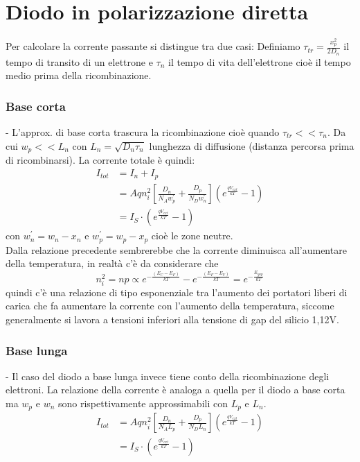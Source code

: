 \documentclass{article}
\begin{document}
\section*{Diodo in polarizzazione diretta}
Per calcolare la corrente passante si distingue tra due casi:
Definiamo $\tau_{tr} = \frac{x_p^2}{2D_n}$ il tempo di transito di un elettrone e $\tau_n$ il tempo di vita dell'elettrone cioè il tempo medio prima della  ricombinazione.

\subsubsection*{Base corta}
- L'approx. di base corta trascura la ricombinazione cioè quando $\tau_{tr}<<\tau_n$. Da cui $w_p<<L_n$ con $L_n = \sqrt{D_n \tau_n}$ lunghezza di diffusione (distanza percorsa prima di ricombinarsi).
La corrente totale è quindi:
\begin{align*}
I_{tot} &= I_n + I_p\\
&= Aqn_i^2 \left[ \frac{D_n}{N_A w_p^\prime} + \frac{D_p}{N_D w_n^\prime} \right] \left( e^\frac{qV_{ext}}{kT} - 1 \right)\\
&= I_S \cdot \left( e^\frac{qV_{ext}}{kT} - 1 \right)
\end{align*}
con $w_n^\prime = w_n - x_n$ e $w_p^\prime = w_p - x_p$ cioè le zone neutre.\\
Dalla relazione precedente sembrerebbe che la corrente diminuisca all'aumentare della temperatura, in realtà c'è da considerare che 
\begin{equation*}
n_i^2 = np \propto e^{-\frac{(E_C - E_F)}{kT}} - e^{-\frac{(E_F - E_V)}{kT}} = e^{-\frac{E_{gap}}{kT}}
\end{equation*}
quindi c'è una relazione di tipo esponenziale tra l'aumento dei portatori liberi di carica che fa aumentare la corrente con l'aumento della temperatura, siccome generalmente si lavora a tensioni inferiori alla tensione di gap del silicio 1,12V.

\subsubsection*{Base lunga}
- Il caso del diodo a base lunga invece tiene conto della ricombinazione degli elettroni. La relazione della corrente è analoga a quella per il diodo a base corta ma $w_p$ e $w_n$ sono rispettivamente approssimabili con $L_p$ e $L_n$. 
\begin{align*}
I_{tot} &= Aqn_i^2 \left[ \frac{D_n}{N_A L_p} + \frac{D_p}{N_D L_n} \right] \left( e^\frac{qV_{ext}}{kT} - 1 \right)\\
&= I_S \cdot \left( e^\frac{qV_{ext}}{kT} - 1 \right)
\end{align*}
\end{document}
